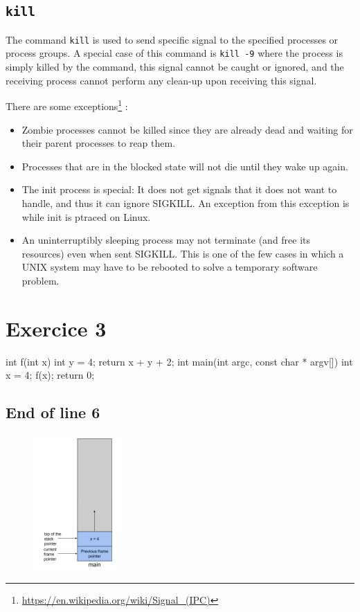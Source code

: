 \documentclass[a4paper,11pt]{report}
\begin{document}
\subsection*{\texttt{kill}}

The command \verb+kill+ is used to send specific signal to the specified
processes or process groups. A special case of this command is \verb+kill -9+
where the process is simply killed by the command, this signal cannot be caught
or ignored, and the receiving process cannot perform any clean-up upon receiving
this signal.

There are some exceptions\footnote{\url{https://en.wikipedia.org/wiki/Signal_(IPC)}} :
\begin{itemize}
\item Zombie processes cannot be killed since they are already dead and waiting
  for their parent processes to reap them.
\item Processes that are in the blocked state will not die until they wake up
  again.
\item The init process is special: It does not get signals that it does not want
  to handle, and thus it can ignore SIGKILL. An exception from this exception
  is while init is ptraced on Linux.
\item An uninterruptibly sleeping process may not terminate (and free its
  resources) even when sent SIGKILL. This is one of the few cases in which a
  UNIX system may have to be rebooted to solve a temporary software problem.
\end{itemize}

\FloatBarrier

\section*{Exercice 3}

\begin{ccodeline}
  int f(int x) {
    int y = 4;
    return x + y + 2;
  }
  int main(int argc, const char * argv[]) {
    int x = 4;
    f(x);
    return 0;
  }
\end{ccodeline}

\newpage

\subsection*{End of line 6}

\begin{figure}[h]
  \centering
  \includegraphics[width=0.3\textwidth]{figures/ex3_schema1}
\end{figure}
\end{document}

